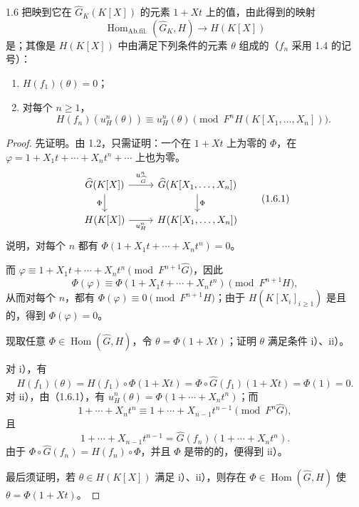 \begin{SGAresult}{}{1.6}
把映到它在 $\widehat G_K(K[X])$ 的元素 $1+Xt$ 上的值，由此得到的映射
\[
\operatorname{Hom}_{\mathrm{Ab.fil.}}(\widehat G_K,H)\longrightarrow H(K[X])
\]
是；其像是 $H(K[X])$ 中由满足下列条件的元素 $\theta$ 组成的（$f_n$ 采用 1.4 的记号）：
\begin{enumerate}
\item[i)] $H(f_1)(\theta)=0$；
\item[ii)] 对每个 $n\geqslant1$，
\[
H(f_n)(u_H^n(\theta))\equiv u_H^n(\theta)
\pmod{F^nH(K[X_1,\ldots,X_n])}.
\]
\end{enumerate}
\end{SGAresult}
\begin{proof}
先证明。由 1.2，只需证明：一个在 $1+Xt$ 上为零的 $\Phi$，在 $\varphi=1+X_1t+\cdots+X_nt^n+\cdots$ 上也为零。
\[
\begin{tikzcd}
\widehat G(K[X])\arrow[r,"u_{\widehat G}^n"]\arrow[d,"\Phi"'] &
\widehat G(K[X_1,\ldots,X_n])\arrow[d,"\Phi"]\\
H(K[X])\arrow[r,"u_H^n"'] & H(K[X_1,\ldots,X_n])
\end{tikzcd}
\tag{1.6.1}
\]
说明，对每个 $n$ 都有 $\Phi(1+X_1t+\cdots+X_nt^n)=0$。

而 $\varphi\equiv1+X_1t+\cdots+X_nt^n\pmod{F^{n+1}\widehat G}$，因此
\[
\Phi(\varphi)\equiv\Phi(1+X_1t+\cdots+X_nt^n)\pmod{F^{n+1}H},
\]
从而对每个 $n$，都有 $\Phi(\varphi)\equiv0\pmod{F^{n+1}H}$；由于 $H(K[X_i]_{i\geqslant1})$ 是且的，得到 $\Phi(\varphi)=0$。

现取任意 $\Phi\in\operatorname{Hom}(\widehat G,H)$，令
$\theta=\Phi(1+Xt)$；证明 $\theta$ 满足条件 i）、ii）。

对 i），有
\[
H(f_1)(\theta)=H(f_1)\circ\Phi(1+Xt)
=\Phi\circ\widehat G(f_1)(1+Xt)=\Phi(1)=0.
\]
对 ii），由（1.6.1），有 $u_H^n(\theta)=\Phi(1+\cdots+X_nt^n)$；而
\[
1+\cdots+X_nt^n\equiv1+\cdots+X_{n-1}t^{n-1}\pmod{F^n\widehat G},
\]
且
\[
1+\cdots+X_{n-1}t^{n-1}=\widehat G(f_n)(1+\cdots+X_nt^n).
\]
由于 $\Phi\circ\widehat G(f_n)=H(f_n)\circ\Phi$，并且 $\Phi$ 是带的的，便得到 ii）。

最后须证明，若 $\theta\in H(K[X])$ 满足 i）、ii），则存在 $\Phi\in\operatorname{Hom}(\widehat G,H)$ 使 $\theta=\Phi(1+Xt)$。


\end{proof}
